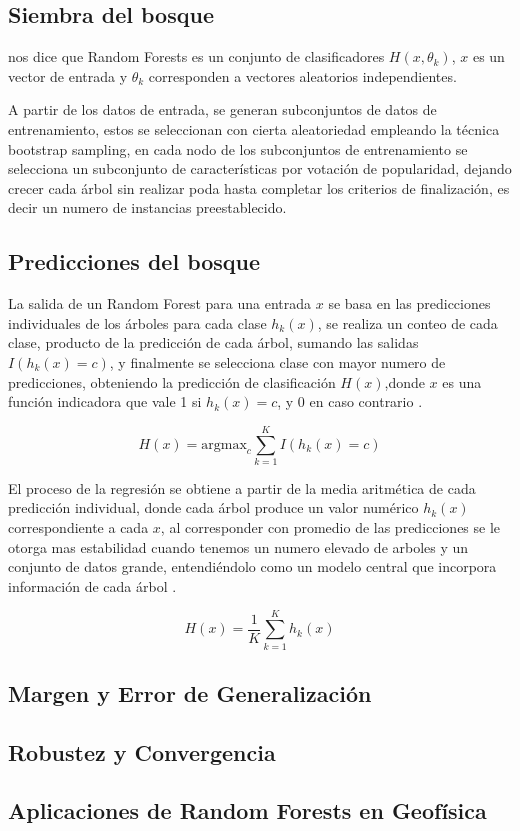 		\subsection{Siembra del bosque}
		
			\citet{breiman2001} nos dice que Random Forests es un conjunto de clasificadores $H(x,\theta_{k})$, $x$ es un vector de entrada y $\theta_{k}$ corresponden a vectores aleatorios independientes.
			
			A partir de los datos de entrada, se generan subconjuntos de datos de entrenamiento, estos se seleccionan con cierta aleatoriedad empleando la técnica bootstrap sampling, en cada nodo de los subconjuntos de entrenamiento se selecciona un subconjunto de características por votación de popularidad, dejando crecer cada árbol sin realizar poda hasta completar los criterios de finalización, es decir un numero de instancias preestablecido\citep{breiman2001}.
			
		\subsection{Predicciones del bosque}
		
			
			 La salida de un Random Forest para una entrada $x$ se basa en las predicciones individuales de los árboles para cada clase $h_{k}(x)$, se realiza un conteo de cada clase, producto de la predicción de cada árbol, sumando las salidas $I(h_{k}(x)=c)$, y finalmente se selecciona clase con mayor numero de predicciones, obteniendo la predicción de clasificación $H(x)$,donde $x$ es una función indicadora que vale 1 si $h_{k}(x)=c$, y $0$ en caso contrario \citep{breiman2001}.
			
			\begin{equation}
				H(x) = \text{argmax}_c \sum_{k=1}^K I(h_k(x) = c)
			\end{equation}

			
			El proceso de la regresión se obtiene a partir de la media aritmética de cada predicción individual, donde cada árbol produce un valor numérico $h_{k}(x)$ correspondiente a cada $x$, al corresponder con promedio de las predicciones se le otorga mas estabilidad cuando tenemos un numero elevado de arboles  y un conjunto de datos grande, entendiéndolo como un modelo central que incorpora información de cada árbol \citep{breiman2001}. 
			
			\begin{equation}
					H(x) = \frac{1}{K} \sum_{k=1}^K h_k(x)	
			\end{equation}

		\subsection{Margen y Error de Generalización}
		\subsection{Robustez y Convergencia}
		\subsection{Aplicaciones de Random Forests en Geofísica}
	